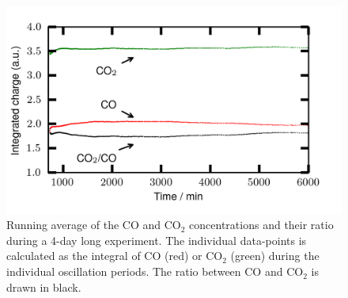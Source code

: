 \documentclass[journal=jacsat,manuscript=article]{achemso}
\begin{document}
\begin{figure}
  \includegraphics[width=12cm]{duty_cycles_long_measurement_supplemental.png}
  \caption{Running average of the CO and CO$_2$ concentrations and their ratio
  during a 4-day long experiment. The individual data-points is calculated as
  the integral of CO (red) or CO$_2$ (green) during the individual oscillation
  periods. The ratio between CO and CO$_2$ is drawn in black.}
  \label{fgr:duty_cycles_supplemental}
\end{figure}
\end{document}
